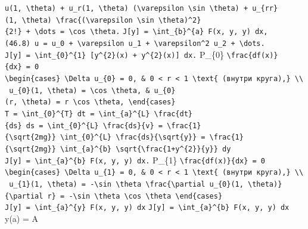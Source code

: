 \documentclass[
  ukrainian,
]{article}
\begin{document}
\texttt{u(1,\ \textbackslash{}theta)\ +\ u\_r(1,\ \textbackslash{}theta)\ (\textbackslash{}varepsilon\ \textbackslash{}sin\ \textbackslash{}theta)\ +\ u\_\{rr\}(1,\ \textbackslash{}theta)\ \textbackslash{}frac\{(\textbackslash{}varepsilon\ \textbackslash{}sin\ \textbackslash{}theta)\^{}2\}\{2!\}\ +\ \textbackslash{}dots\ =\ \textbackslash{}cos\ \textbackslash{}theta.}
\texttt{J{[}y{]}\ =\ \textbackslash{}int\_\{b\}\^{}\{a\}\ F(x,\ y,\ y\textquotesingle{})\ dx,}
\texttt{(46.8)\ u\ =\ u\_0\ +\ \textbackslash{}varepsilon\ u\_1\ +\ \textbackslash{}varepsilon\^{}2\ u\_2\ +\ \textbackslash{}dots.}
\texttt{J{[}y{]}\ =\ \textbackslash{}int\_\{0\}\^{}\{1\}\ {[}y\^{}\{2\}(x)\ +\ y\textquotesingle{}\^{}\{2\}(x){]}\ dx.}
P\_\{0\} \texttt{\textbackslash{}frac\{df(x)\}\{dx\}\ =\ 0}
\texttt{\textbackslash{}begin\{cases\}\ \textbackslash{}Delta\ u\_\{0\}\ =\ 0,\ \&\ 0\ \textless{}\ r\ \textless{}\ 1\ \textbackslash{}text\{\ (внутри\ круга),\}\ \textbackslash{}\textbackslash{}\ u\_\{0\}(1,\ \textbackslash{}theta)\ =\ \textbackslash{}cos\ \textbackslash{}theta,\ \&\ u\_\{0\}(r,\ \textbackslash{}theta)\ =\ r\ \textbackslash{}cos\ \textbackslash{}theta,\ \textbackslash{}end\{cases\}}
\texttt{T\ =\ \textbackslash{}int\_\{0\}\^{}\{T\}\ dt\ =\ \textbackslash{}int\_\{a\}\^{}\{L\}\ \textbackslash{}frac\{dt\}\{ds\}\ ds\ =\ \textbackslash{}int\_\{0\}\^{}\{L\}\ \textbackslash{}frac\{ds\}\{v\}\ =\ \textbackslash{}frac\{1\}\{\textbackslash{}sqrt\{2mg\}\}\ \textbackslash{}int\_\{0\}\^{}\{L\}\ \textbackslash{}frac\{ds\}\{\textbackslash{}sqrt\{y\}\}\ =\ \textbackslash{}frac\{1\}\{\textbackslash{}sqrt\{2mg\}\}\ \textbackslash{}int\_\{a\}\^{}\{b\}\ \textbackslash{}sqrt\{\textbackslash{}frac\{1+y\textquotesingle{}\^{}\{2\}\}\{y\}\}\ dy}
\texttt{J{[}y{]}\ =\ \textbackslash{}int\_\{a\}\^{}\{b\}\ F(x,\ y,\ y\textquotesingle{})\ dx.}
P\_\{1\} \texttt{\textbackslash{}frac\{df(x)\}\{dx\}\ =\ 0}
\texttt{\textbackslash{}begin\{cases\}\ \textbackslash{}Delta\ u\_\{1\}\ =\ 0,\ \&\ 0\ \textless{}\ r\ \textless{}\ 1\ \textbackslash{}text\{\ (внутри\ круга),\}\ \textbackslash{}\textbackslash{}\ u\_\{1\}(1,\ \textbackslash{}theta)\ =\ -\textbackslash{}sin\ \textbackslash{}theta\ \textbackslash{}frac\{\textbackslash{}partial\ u\_\{0\}(1,\ \textbackslash{}theta)\}\{\textbackslash{}partial\ r\}\ =\ -\textbackslash{}sin\ \textbackslash{}theta\ \textbackslash{}cos\ \textbackslash{}theta\ \textbackslash{}end\{cases\}}
\texttt{J{[}y{]}\ =\ \textbackslash{}int\_\{a\}\^{}\{y\}\ F(x,\ y,\ y\textquotesingle{})\ dx}
\texttt{J{[}y{]}\ =\ \textbackslash{}int\_\{a\}\^{}\{b\}\ F(x,\ y,\ y\textquotesingle{})\ dx}
y(a) = A
\end{document}
